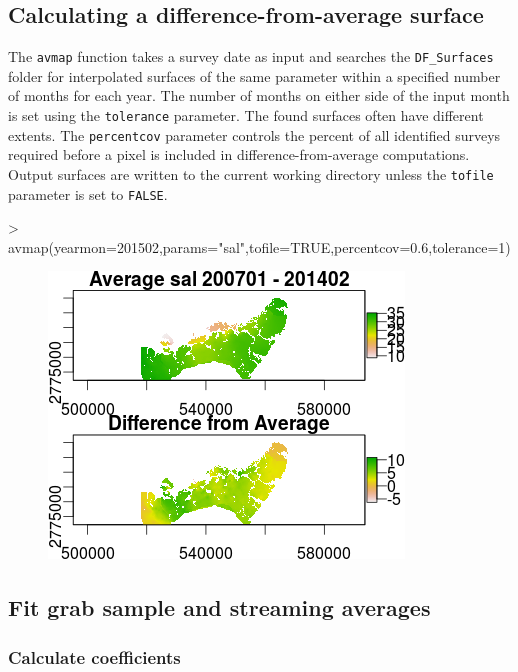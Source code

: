 \documentclass[12pt]{article}
\begin{document}
\subsection{Calculating a difference-from-average surface}
The \texttt{avmap} function takes a survey date as input and searches the \verb|DF_Surfaces| folder for interpolated surfaces of the same parameter within a specified number of months for each year. The number of months on either side of the input month is set using the \texttt{tolerance} parameter. The found surfaces often have different extents. The \texttt{percentcov} parameter controls the percent of all identified surveys required before a pixel is included in difference-from-average computations. Output surfaces are written to the current working directory unless the \texttt{tofile} parameter is set to \texttt{FALSE}.

\begin{Schunk}
\begin{Sinput}
> avmap(yearmon=201502,params="sal",tofile=TRUE,percentcov=0.6,tolerance=1)
\end{Sinput}
\end{Schunk}

\begin{figure}[H]
\begin{center}
\includegraphics{figure2}
\end{center}
\label{fig:two}
\end{figure}

\subsection{Fit grab sample and streaming averages}
\subsubsection{Calculate coefficients}
\end{document}
